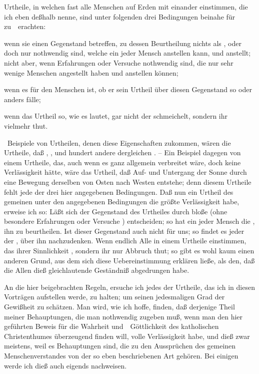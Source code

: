 \begin{aufza}
\item Urtheile, in welchen fast alle Menschen auf Erden mit einander einstimmen, die ich eben deßhalb  nenne, sind unter folgenden drei Bedingungen beinahe für  zu~\ erachten: \begin{inparaenum} \item wenn sie einen Gegenstand betreffen, zu dessen Beurtheilung nichts als , oder doch nur  nothwendig sind, welche ein jeder Mensch anstellen kann, und anstellt; nicht aber, wenn Erfahrungen oder Versuche nothwendig sind, die nur sehr wenige Menschen angestellt haben und anstellen können; \item wenn es  für den Menschen ist, ob er sein Urtheil über diesen Gegenstand so oder anders fälle; \item wenn das Urtheil so, wie es lautet, gar nicht der  schmeichelt, sondern ihr vielmehr  thut.\end{inparaenum}\ Beispiele von Urtheilen, denen diese Eigenschaften zukommen, wären die Urtheile, daß , , und hundert andere dergleichen . -- Ein Beispiel dagegen von einem Urtheile, das, auch wenn es ganz allgemein verbreitet wäre, doch keine Verlässigkeit hätte, wäre das Urtheil, daß Auf- und Untergang der Sonne durch eine Bewegung derselben von Osten nach Westen entstehe; denn diesem Urtheile fehlt jede der drei hier angegebenen Bedingungen. Daß nun ein Urtheil des gemeinen  unter den angegebenen Bedingungen die größte Verlässigkeit habe, erweise ich so: Läßt sich der Gegenstand des Urtheiles durch bloße  (ohne besondere Erfahrungen oder Versuche \udgl ) entscheiden; so hat ein jeder Mensch die , ihn zu beurtheilen. Ist dieser Gegenstand auch nicht  für uns; so findet es jeder der , über ihn nachzudenken. Wenn endlich Alle in einem Urtheile einstimmen, das ihrer Sinnlichkeit , sondern ihr nur Abbruch thut; so gibt es wohl kaum einen anderen Grund, aus dem sich diese Uebereinstimmung erklären ließe, als den, daß die  Allen dieß gleichlautende Geständniß abgedrungen 
habe.
\end{aufza}
An die hier beigebrachten Regeln, ersuche ich jedes der Urtheile, das ich in diesen Vorträgen aufstellen werde, zu halten; um seinen jedesmaligen Grad der Gewißheit zu schätzen. Man wird, wie ich hoffe, finden, daß derjenige Theil meiner Behauptungen, die man nothwendig zugeben muß, wenn man den hier geführten Beweis für die Wahrheit und~\ Göttlichkeit des katholischen Christenthumes überzeugend finden will, volle Verlässigkeit habe, und dieß zwar meistens, weil es Behauptungen sind, die zu den Aussprüchen des gemeinen Menschenverstandes von der so eben beschriebenen Art gehören. Bei einigen werde ich dieß auch eigends nachweisen.


